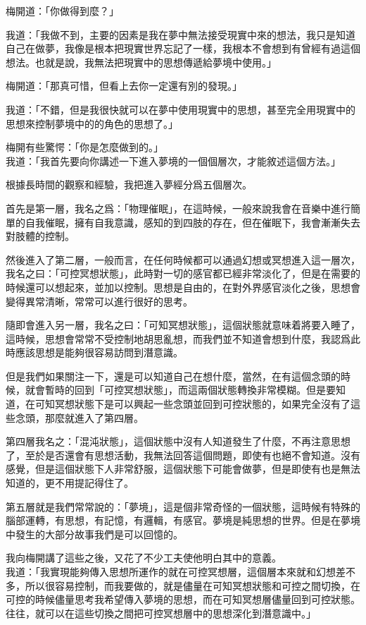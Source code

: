 梅開道：「你做得到麼？」

我道：「我做不到，主要的因素是我在夢中無法接受現實中來的想法，我只是知道自己在做夢，我像是根本把現實世界忘記了一樣，我根本不會想到有曾經有過這個想法。也就是說，我無法把現實中的思想傳遞給夢境中使用。」

梅開道：「那真可惜，但看上去你一定還有別的發現。」

我道：「不錯，但是我很快就可以在夢中使用現實中的思想，甚至完全用現實中的思想來控制夢境中的的角色的思想了。」

梅開有些驚愕：「你是怎麼做到的。」
\\


我道：「我首先要向你講述一下進入夢境的一個個層次，才能敘述這個方法。」

根據長時間的觀察和經驗，我把進入夢經分爲五個層次。

首先是第一層，我名之爲：「物理催眠」，在這時候，一般來說我會在音樂中進行簡單的自我催眠，擁有自我意識，感知的到四肢的存在，但在催眠下，我會漸漸失去對肢體的控制。

然後進入了第二層，一般而言，在任何時候都可以通過幻想或冥想進入這一層次，我名之曰：「可控冥想狀態」，此時對一切的感官都已經非常淡化了，但是在需要的時候還可以想起來，並加以控制。思想是自由的，在對外界感官淡化之後，思想會變得異常清晰，常常可以進行很好的思考。

隨即會進入另一層，我名之曰：「可知冥想狀態」，這個狀態就意味着將要入睡了，這時候，思想會常常不受控制地胡思亂想，而我們並不知道會想到什麼，我認爲此時應該思想是能夠很容易訪問到潛意識。

但是我們如果關注一下，還是可以知道自己在想什麼，當然，在有這個念頭的時候，就會暫時的回到「可控冥想狀態」，而這兩個狀態轉換非常模糊。但是要知道，在可知冥想狀態下是可以興起一些念頭並回到可控狀態的，如果完全沒有了這些念頭，那麼就進入了第四層。

第四層我名之：「混沌狀態」，這個狀態中沒有人知道發生了什麼，不再注意思想了，至於是否還會有思想活動，我無法回答這個問題，即使有也絕不會知道。沒有感覺，但是這個狀態下人非常舒服，這個狀態下可能會做夢，但是即使有也是無法知道的，更不用提記得住了。

第五層就是我們常常說的：「夢境」，這是個非常奇怪的一個狀態，這時候有特殊的腦部運轉，有思想，有記憶，有邏輯，有感官。夢境是純思想的世界。但是在夢境中發生的大部分故事我們是可以回憶的。

我向梅開講了這些之後，又花了不少工夫使他明白其中的意義。
\\


我道：「我實現能夠傳入思想所運作的就在可控冥想層，這個層本來就和幻想差不多，所以很容易控制，而我要做的，就是儘量在可知冥想狀態和可控之間切換，在可控的時候儘量思考我希望傳入夢境的思想，而在可知冥想層儘量回到可控狀態。往往，就可以在這些切換之間把可控冥想層中的思想深化到潛意識中。」

